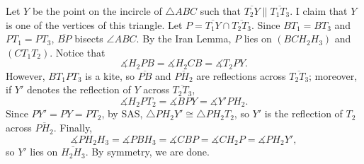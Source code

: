 Let $Y$ be the point on the incircle of $\triangle ABC$ such that $\overline{T_2Y}\parallel\overline{T_1T_3}$. I claim that $Y$ is one of the vertices of this triangle. Let $P=\overline{T_1Y}\cap\overline{T_2T_3}$. Since $BT_1=BT_3$ and $PT_1=PT_3$, $\overline{BP}$ bisects $\angle ABC$. By the Iran Lemma, $P$ lies on $(BCH_2H_3)$ and $(CT_1T_2)$. Notice that \[\measuredangle H_2PB=\measuredangle H_2CB=\measuredangle T_2PY.\]However, $BT_1PT_3$ is a kite, so $\overline{PB}$ and $\overline{PH_2}$ are reflections across $\overline{T_2T_3}$; moreover, if $Y'$ denotes the reflection of $Y$ across $\overline{T_2T_3}$, \[\measuredangle H_2PT_2=\measuredangle BPY=\measuredangle Y'PH_2.\]Since $PY'=PY=PT_2$, by SAS, $\triangle PH_2Y'\cong\triangle PH_2T_2$, so $Y'$ is the reflection of $T_2$ across $\overline{PH_2}$. Finally, \[\measuredangle PH_2H_3=\measuredangle PBH_3=\measuredangle CBP=\measuredangle CH_2P=\measuredangle PH_2Y',\]so $Y'$ lies on $\overline{H_2H_3}$. By symmetry, we are done. 


